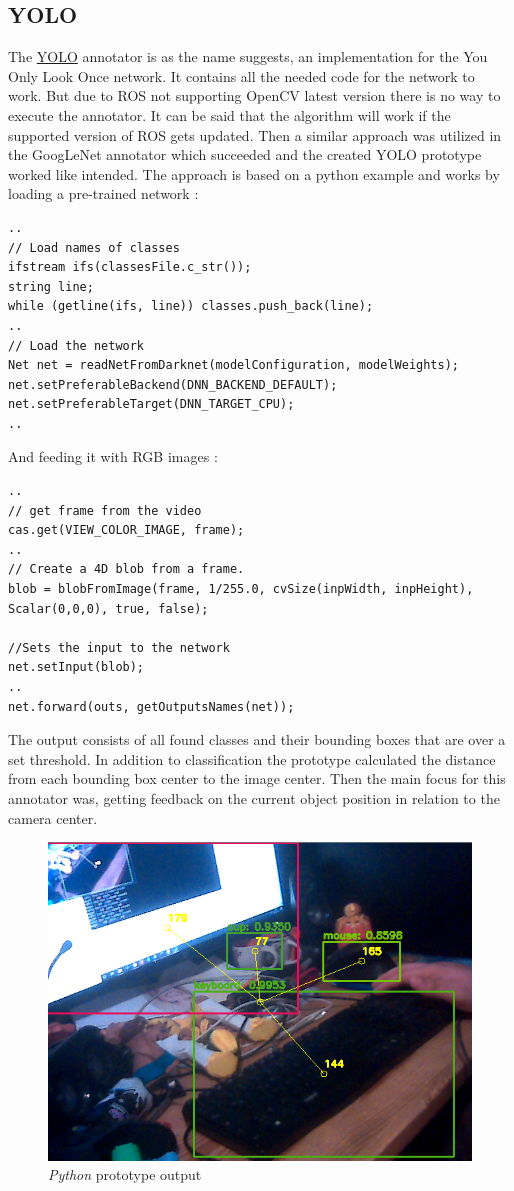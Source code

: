 \documentclass[main.tex]{subfiles}
\begin{document}
				\subsection{YOLO}
The \href{https://github.com/SUTURO/suturo_perception/blob/Handcamera_tracking/rs_Athene/src/Yolo.cpp}{YOLO} annotator is as the name suggests, an implementation for the You Only Look Once network. It contains all the needed code for the network to work.
But due to ROS not supporting OpenCV latest version there is no way to execute the annotator. It can be said that the algorithm will work if the supported version of ROS gets updated. Then a similar approach was utilized in the GoogLeNet annotator which succeeded and the created YOLO prototype worked like intended.
The approach is based on a python example and works by loading a pre-trained network : 
\begin{lstlisting}
..
// Load names of classes
ifstream ifs(classesFile.c_str());
string line;
while (getline(ifs, line)) classes.push_back(line);
..
// Load the network
Net net = readNetFromDarknet(modelConfiguration, modelWeights);
net.setPreferableBackend(DNN_BACKEND_DEFAULT);
net.setPreferableTarget(DNN_TARGET_CPU);
..
\end{lstlisting}
And feeding it with RGB images : 
\begin{lstlisting}
..
// get frame from the video
cas.get(VIEW_COLOR_IMAGE, frame);
..
// Create a 4D blob from a frame.
blob = blobFromImage(frame, 1/255.0, cvSize(inpWidth, inpHeight), Scalar(0,0,0), true, false);
        
//Sets the input to the network
net.setInput(blob);
..
net.forward(outs, getOutputsNames(net));
\end{lstlisting}

The output consists of all found classes and their bounding boxes that are over a set threshold.
In addition to classification the prototype calculated the distance from each bounding box center to the image center. 
Then the main focus for this annotator was, getting feedback on the current object position in relation to the camera center.

\begin{figure}[H]
\centering
\includegraphics[width=1\textwidth]{pictures/perception/YOLO.png}
\caption{\textit{Python} prototype output}
\end{figure}
\end{document}
